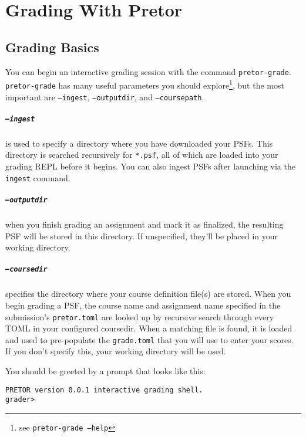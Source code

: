 \documentclass{book}
\begin{document}
\chapter{Grading With Pretor}

\section{Grading Basics}

You can begin an interactive grading session with the command
\texttt{pretor-grade}. \texttt{pretor-grade} has many useful parameters you
should explore\footnote{see \texttt{pretor-grade --help}}, but the most
important are \texttt{--ingest}, \texttt{--outputdir}, and
\texttt{--coursepath}.

\paragraph{\texttt{--ingest}} is used to specify a directory where you have
downloaded your PSFs. This directory is searched recursively for
\texttt{*.psf}, all of which are loaded into your grading REPL before it
begins. You can also ingest PSFs after launching via the \texttt{ingest}
command.

\paragraph{\texttt{--outputdir}} when you finish grading an assignment and mark
it as finalized, the resulting PSF will be stored in this directory. If
unspecified, they'll be placed in your working directory.

\paragraph{\texttt{--coursedir}} specifies the directory where your course
definition file(s) are stored. When you begin grading a PSF, the course name
and assignment name specified in the submission's \texttt{pretor.toml} are
looked up by recursive search through every TOML in your configured coursedir.
When a matching file is found, it is loaded and used to pre-populate the
\texttt{grade.toml} that you will use to enter your scores. If you don't
specify this, your working directory will be used.

You should be greeted by a prompt that looks like this:

\begin{verbatim}
PRETOR version 0.0.1 interactive grading shell.
grader>
\end{verbatim}
\end{document}
